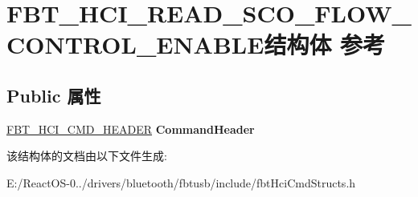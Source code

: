 \hypertarget{struct_f_b_t___h_c_i___r_e_a_d___s_c_o___f_l_o_w___c_o_n_t_r_o_l___e_n_a_b_l_e}{}\section{F\+B\+T\+\_\+\+H\+C\+I\+\_\+\+R\+E\+A\+D\+\_\+\+S\+C\+O\+\_\+\+F\+L\+O\+W\+\_\+\+C\+O\+N\+T\+R\+O\+L\+\_\+\+E\+N\+A\+B\+L\+E结构体 参考}
\label{struct_f_b_t___h_c_i___r_e_a_d___s_c_o___f_l_o_w___c_o_n_t_r_o_l___e_n_a_b_l_e}
\subsection*{Public 属性}
\begin{DoxyCompactItemize}
\item 
\mbox{\label{struct_f_b_t___h_c_i___r_e_a_d___s_c_o___f_l_o_w___c_o_n_t_r_o_l___e_n_a_b_l_e_ab8795e3f3c0690160c228eac87e39a18}} 
\hyperlink{struct_f_b_t___h_c_i___c_m_d___h_e_a_d_e_r}{F\+B\+T\+\_\+\+H\+C\+I\+\_\+\+C\+M\+D\+\_\+\+H\+E\+A\+D\+ER} {\bfseries Command\+Header}
\end{DoxyCompactItemize}


该结构体的文档由以下文件生成\+:\begin{DoxyCompactItemize}
\item 
E\+:/\+React\+O\+S-\/0../drivers/bluetooth/fbtusb/include/fbt\+Hci\+Cmd\+Structs.\+h\end{DoxyCompactItemize}
